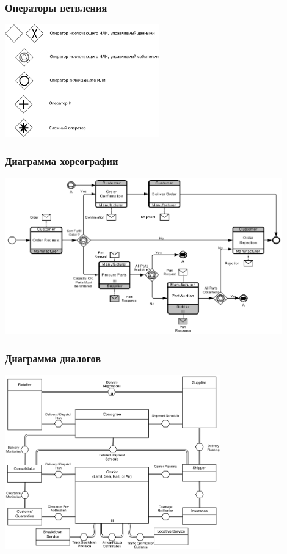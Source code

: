 \documentclass{../../slides-style}
\begin{document}
    \begin{frame}
        \frametitle{Операторы ветвления}
        \begin{center}
            \includegraphics[width=0.5\textwidth]{bpmnGateways.png}
        \end{center}
    \end{frame}

    \begin{frame}
        \frametitle{Диаграмма хореографии}
        \begin{center}
            \includegraphics[width=0.9\textwidth]{bpmnChoreography.png}
        \end{center}
    \end{frame}

    \begin{frame}
        \frametitle{Диаграмма диалогов}
        \begin{center}
            \includegraphics[width=0.7\textwidth]{bpmnConversation.png}
        \end{center}
    \end{frame}
\end{document}
